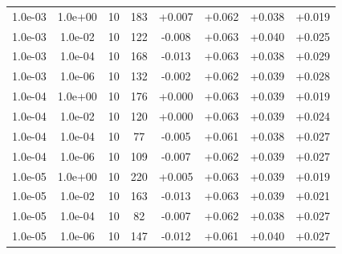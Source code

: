 \documentclass[11pt,a4paper]{article}
\begin{document}
\begin{table}
{\begin{tabular}{*{8}c}
 1.0e-03 	 & 1.0e+00 	 & 10 & 183 	 & +0.007 & +0.062 & +0.038 & +0.019 \\ 
 1.0e-03 	 & 1.0e-02 	 & 10 & 122 	 & -0.008 & +0.063 & +0.040 & +0.025 \\ 
 1.0e-03 	 & 1.0e-04 	 & 10 & 168 	 & -0.013 & +0.063 & +0.038 & +0.029 \\ 
 1.0e-03 	 & 1.0e-06 	 & 10 & 132 	 & -0.002 & +0.062 & +0.039 & +0.028 \\ 

 1.0e-04 	 & 1.0e+00 	 & 10 & 176 	 & +0.000 & +0.063 & +0.039 & +0.019 \\ 
 1.0e-04 	 & 1.0e-02 	 & 10 & 120 	 & +0.000 & +0.063 & +0.039 & +0.024 \\ 
 1.0e-04 	 & 1.0e-04 	 & 10 & 77 	 & -0.005 & +0.061 & +0.038 & +0.027 \\ 
 1.0e-04 	 & 1.0e-06 	 & 10 & 109 	 & -0.007 & +0.062 & +0.039 & +0.027 \\ 

 1.0e-05 	 & 1.0e+00 	 & 10 & 220 	 & +0.005 & +0.063 & +0.039 & +0.019 \\ 
 1.0e-05 	 & 1.0e-02 	 & 10 & 163 	 & -0.013 & +0.063 & +0.039 & +0.021 \\ 
 1.0e-05 	 & 1.0e-04 	 & 10 & 82 	 & -0.007 & +0.062 & +0.038 & +0.027 \\ 
 1.0e-05 	 & 1.0e-06 	 & 10 & 147 	 & -0.012 & +0.061 & +0.040 & +0.027 \\ 


\end{tabular}}
\end{table}
\end{document}
